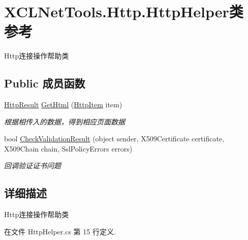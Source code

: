\hypertarget{class_x_c_l_net_tools_1_1_http_1_1_http_helper}{\section{X\-C\-L\-Net\-Tools.\-Http.\-Http\-Helper类 参考}
\label{class_x_c_l_net_tools_1_1_http_1_1_http_helper}
}


Http连接操作帮助类  


\subsection*{Public 成员函数}
\begin{DoxyCompactItemize}
\item 
\hyperlink{class_x_c_l_net_tools_1_1_http_1_1_http_result}{Http\-Result} \hyperlink{class_x_c_l_net_tools_1_1_http_1_1_http_helper_a1115d0f405e29654961ad3bcd5272bdf}{Get\-Html} (\hyperlink{class_x_c_l_net_tools_1_1_http_1_1_http_item}{Http\-Item} item)
\begin{DoxyCompactList}\small\item\em 根据相传入的数据，得到相应页面数据 \end{DoxyCompactList}\item 
bool \hyperlink{class_x_c_l_net_tools_1_1_http_1_1_http_helper_aed104c08e4f4e44e2f3b7529e85c2848}{Check\-Validation\-Result} (object sender, X509\-Certificate certificate, X509\-Chain chain, Ssl\-Policy\-Errors errors)
\begin{DoxyCompactList}\small\item\em 回调验证证书问题 \end{DoxyCompactList}\end{DoxyCompactItemize}


\subsection{详细描述}
Http连接操作帮助类 



在文件 Http\-Helper.\-cs 第 15 行定义.




